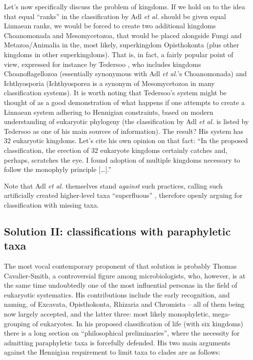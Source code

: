 \begin{artengenv}
Let’s now specifically discuss the problem of kingdoms. If we hold on to the idea that equal ``ranks'' in the
classification by Adl \textit{et al.} should be given equal Linnaean ranks, we would be forced to create two additional
kingdoms Choanomonada and Mesomycetozoa, that would be placed alongside Fungi and Metazoa/Animalia in the, most likely,
superkingdom Opisthokonta (plus other kingdoms in other superkingdoms). That is, in fact, a fairly popular point of
view, expressed for instance by Tedersoo
\parencite*{tedersoo_proposal_2017},
who includes kingdoms Choanoflagellozoa
(essentially synonymous with Adl \textit{et al.}’s Choanomonada) and Ichthyosporia (Ichthyosporea is a synonym of
Mesomycetozoa in many classification systems). It is worth noting that Tedersoo’s system might be thought of as a good
demonstration of what happens if one attempts to create a Linnaean system adhering to Hennigian constraints, based on
modern understanding of eukaryotic phylogeny (the classification by Adl \textit{et al.} is listed by Tedersoo as one of
his main sources of information). The result? His system has 32 eukaryotic kingdoms. Let’s cite his own opinion on that
fact: ``In the proposed classification, the erection of 32 eukaryote kingdoms certainly catches and, perhaps, scratches
the eye. I found adoption of multiple kingdoms necessary to follow the monophyly principle […].''
\parencite[p.8]{tedersoo_proposal_2017}

Note that Adl \textit{et al. }themselves stand \textit{against }such practices, calling such artificially created
higher-level taxa ``superfluous''
\parencite[p.430]{adl_revised_2012},
therefore openly arguing for
classification with missing taxa.

\subsection{Solution II: classifications with paraphyletic taxa}

The most vocal contemporary proponent of that solution is probably Thomas Cavalier-Smith, a controversial figure among
microbiologists, who, however, is at the same time undoubtedly one of the most influential personas in the field of
eukaryotic systematics. His contributions include the early recognition, and naming, of Excavata, Opisthokonta,
Rhizaria and Chromista -- all of them being now largely accepted, and the latter three: most likely monophyletic,
mega-grouping of eukaryotes. In his proposed classification of life (with six kingdoms)
\parencite{cavalier-smith_revised_1998}
there is a long section on ``philosophical preliminaries'', where the
necessity for admitting paraphyletic taxa is forcefully defended. His two main arguments against the Hennigian
requirement to limit taxa to clades are as follows:


\end{artengenv}
